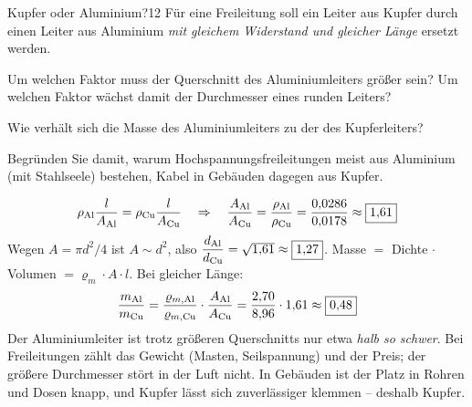 \documentclass[11pt,a4paper]{article}
\begin{document}
\begin{aufgabe}{Kupfer oder Aluminium?}{12}
Für eine Freileitung soll ein Leiter aus Kupfer durch einen Leiter aus Aluminium \emph{mit gleichem Widerstand und gleicher Länge} ersetzt werden.

\begin{teilaufgaben}
  \item Um welchen Faktor muss der Querschnitt des Aluminiumleiters größer sein? Um welchen Faktor wächst damit der Durchmesser eines runden Leiters?
  \item Wie verhält sich die Masse des Aluminiumleiters zu der des Kupferleiters?
  \item Begründen Sie damit, warum Hochspannungsfreileitungen meist aus Aluminium (mit Stahlseele) bestehen, Kabel in Gebäuden dagegen aus Kupfer.
\end{teilaufgaben}
\end{aufgabe}

\begin{loesung}
\[
  \rho_\text{Al}\frac{l}{A_\text{Al}} = \rho_\text{Cu}\frac{l}{A_\text{Cu}}
  \quad\Rightarrow\quad
  \frac{A_\text{Al}}{A_\text{Cu}} = \frac{\rho_\text{Al}}{\rho_\text{Cu}} = \frac{0{,}0286}{0{,}0178} \approx \boxed{1{,}61}
\]
Wegen $A = \pi d^2/4$ ist $A \sim d^2$, also
$\dfrac{d_\text{Al}}{d_\text{Cu}} = \sqrt{1{,}61} \approx \boxed{1{,}27}$.
Masse $=$ Dichte $\cdot$ Volumen $= \varrho_m\cdot A\cdot l$. Bei gleicher Länge:
\[
  \frac{m_\text{Al}}{m_\text{Cu}} = \frac{\varrho_{m,\text{Al}}}{\varrho_{m,\text{Cu}}}\cdot\frac{A_\text{Al}}{A_\text{Cu}}
  = \frac{2{,}70}{8{,}96}\cdot 1{,}61 \approx \boxed{0{,}48}
\]
Der Aluminiumleiter ist trotz größeren Querschnitts nur etwa \emph{halb so schwer}.
Bei Freileitungen zählt das Gewicht (Masten, Seilspannung) und der Preis; der größere Durchmesser stört in der Luft nicht. In Gebäuden ist der Platz in Rohren und Dosen knapp, und Kupfer lässt sich zuverlässiger klemmen -- deshalb Kupfer.
\end{loesung}
\end{document}
